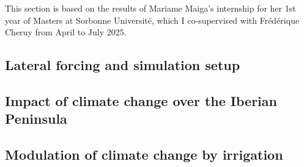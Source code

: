 This section is based on the results of Mariame Maiga's internship for her 1st year of Masters at Sorbonne Université, which I co-supervised with Frédérique Cheruy from April to July 2025.
\subsection{Lateral forcing and simulation setup}
\subsection{Impact of climate change over the Iberian Peninsula}
\subsection{Modulation of climate change by irrigation}